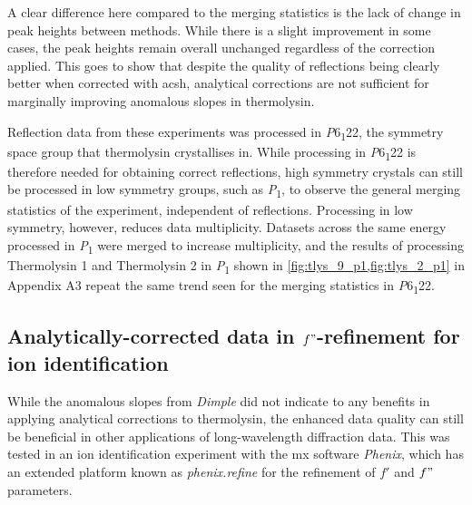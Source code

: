 A clear difference here compared to the merging statistics is the lack of change in peak heights between methods. While there is a slight improvement in some cases, the peak heights remain overall unchanged regardless of the correction applied. This goes to show that despite the quality of reflections being clearly better when corrected with \ac{acsh}, analytical corrections are not sufficient for marginally improving anomalous slopes in thermolysin.%

Reflection data from these experiments was processed in \textit{P}6\textsubscript{1}22, the symmetry space group that thermolysin crystallises in. While processing in \textit{P}6\textsubscript{1}22 is therefore needed for obtaining correct reflections, high symmetry crystals can still be processed in low symmetry groups, such as \textit{P}\textsubscript{1}, to observe the general merging statistics of the experiment, independent of reflections.
Processing in low symmetry, however, reduces data multiplicity. Datasets across the same energy processed in \textit{P}\textsubscript{1} were merged to increase multiplicity, and the results of processing Thermolysin 1 and Thermolysin 2 in \textit{P}\textsubscript{1} shown in \cref{fig:tlys_9_p1,fig:tlys_2_p1} in Appendix A3 repeat the same trend seen for the merging statistics in \textit{P}6\textsubscript{1}22.

\subsection{Analytically-corrected data in $f"$-refinement for ion identification}


While the anomalous slopes from \textit{Dimple} did not indicate to any benefits in applying analytical corrections to thermolysin, the enhanced data quality can still be beneficial in other applications of long-wavelength diffraction data. This was tested in an ion identification experiment with the \ac{mx} software \textit{Phenix}, which has an extended platform known as \textit{phenix.refine} for the refinement of $f'$ and $f"$ parameters.

